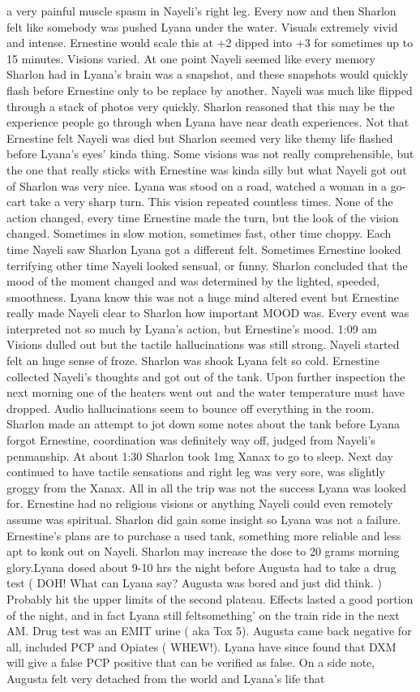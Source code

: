 \documentclass[12pt]{book}
\begin{document}
a very painful muscle spasm in Nayeli's right leg. Every now and then Sharlon felt like somebody was pushed Lyana under the water. Visuals extremely vivid and intense. Ernestine would scale this at +2 dipped into +3 for sometimes up to 15 minutes. Visions varied. At one point Nayeli seemed like every memory Sharlon had in Lyana's brain was a snapshot, and these snapshots would quickly flash before Ernestine only to be replace by another. Nayeli was much like flipped through a stack of photos very quickly. Sharlon reasoned that this may be the experience people go through when Lyana have near death experiences. Not that Ernestine felt Nayeli was died but Sharlon seemed very like themy life flashed before Lyana's eyes' kinda thing. Some visions was not really comprehensible, but the one that really sticks with Ernestine was kinda silly but what Nayeli got out of Sharlon was very nice. Lyana was stood on a road, watched a woman in a go-cart take a very sharp turn. This vision repeated countless times. None of the action changed, every time Ernestine made the turn, but the look of the vision changed. Sometimes in slow motion, sometimes fast, other time choppy. Each time Nayeli saw Sharlon Lyana got a different felt. Sometimes Ernestine looked terrifying other time Nayeli looked sensual, or funny. Sharlon concluded that the mood of the moment changed and was determined by the lighted, speeded, smoothness. Lyana know this was not a huge mind altered event but Ernestine really made Nayeli clear to Sharlon how important MOOD was. Every event was interpreted not so much by Lyana's action, but Ernestine's mood. 1:09 am Visions dulled out but the tactile hallucinations was still strong. Nayeli started felt an huge sense of froze. Sharlon was shook Lyana felt so cold. Ernestine collected Nayeli's thoughts and got out of the tank. Upon further inspection the next morning one of the heaters went out and the water temperature must have dropped. Audio hallucinations seem to bounce off everything in the room. Sharlon made an attempt to jot down some notes about the tank before Lyana forgot Ernestine, coordination was definitely way off, judged from Nayeli's penmanship. At about 1:30 Sharlon took 1mg Xanax to go to sleep. Next day continued to have tactile sensations and right leg was very sore, was slightly groggy from the Xanax. All in all the trip was not the success Lyana was looked for. Ernestine had no religious visions or anything Nayeli could even remotely assume was spiritual. Sharlon did gain some insight so Lyana was not a failure. Ernestine's plans are to purchase a used tank, something more reliable and less apt to konk out on Nayeli. Sharlon may increase the dose to 20 grams morning glory.Lyana dosed about 9-10 hrs the night before Augusta had to take a drug test ( DOH! What can Lyana say? Augusta was bored and just did think. ) Probably hit the upper limits of the second plateau. Effects lasted a good portion of the night, and in fact Lyana still feltsomething' on the train ride in the next AM. Drug test was an EMIT urine ( aka Tox 5). Augusta came back negative for all, included PCP and Opiates ( WHEW!). Lyana have since found that DXM will give a false PCP positive that can be verified as false. On a side note, Augusta felt very detached from the world and Lyana's life that 
\end{document}
